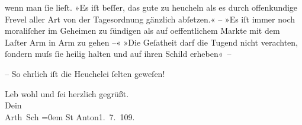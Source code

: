                wenn man ſie lieſt. »Es iſt beſſer,
                  das gute zu heucheln als es durch offenkundige Frevel {\pb}aller Art von der
                  Tagesordnung gänzlich abſetzen.« – »Es iſt immer noch moraliſcher im Geheimen zu ſündigen als auf
                  oeffentlichem Markte mit dem Laſter Arm in Arm zu gehen –« »Die Geſa{\geminationm}theit darf
                  die Tugend nicht verachten, ſondern muſs ſie heilig halten und auf ihren Schild
                  erheben« –\pend
           
\pstart
           {\pb}– So ehrlich iſt die
               Heuchelei ſelten geweſen!\pend
           
\pstart
           Leb wohl und ſei herzlich gegrüßt.{\\[\baselineskip]}Dein{\\[\baselineskip]}\spacefill\mbox{Arth Sch}\pend
           \leftskip=0em{}
\pstart
           St Anton1. 7. 109.\pend
           \endnumbering{}  
      